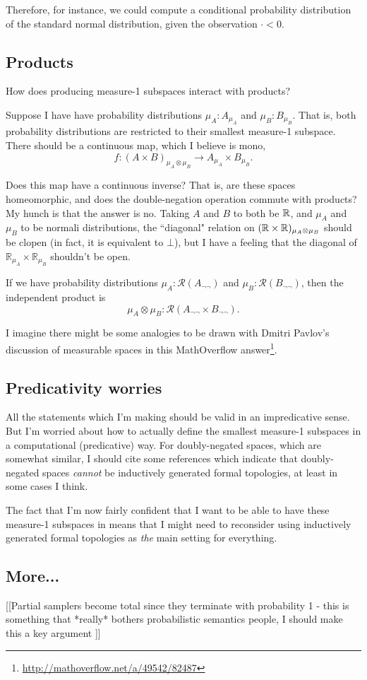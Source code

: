 Therefore, for instance, we could compute a conditional probability distribution of the standard normal distribution, given the observation $\cdot < 0$.

\subsection{Products}

How does producing measure-1 subspaces interact with products? 

Suppose I have have probability distributions $\mu_A : A_{\mu_A}$ and $\mu_B : B_{\mu_B}$. That is, both probability distributions are restricted to their smallest measure-1 subspace. There should be a continuous map, which I believe is mono,
\[f : (A \times B)_{\mu_A \otimes \mu_B} \to A_{\mu_A} \times B_{\mu_B}.\]

Does this map have a continuous inverse? That is, are these spaces homeomorphic, and does the double-negation operation commute with products? My hunch is that the answer is no. Taking $A$ and $B$ to both be $\mathbb{R}$, and $\mu_A$ and $\mu_B$ to be normali distributions, the ``diagonal" relation on $(\mathbb{R} \times \mathbb{R})_{\mu_A \otimes \mu_B}$ should be clopen (in fact, it is equivalent to $\bot$), but I have a feeling that the diagonal of $\mathbb{R}_{\mu_A} \times \mathbb{R}_{\mu_B}$ shouldn't be open.

If we have probability distributions $\mu_A : \mathcal{R}(A_{\neg\neg})$ and $\mu_B : \mathcal{R}(B_{\neg\neg})$, then the independent product is \[\mu_A \otimes \mu_B : \mathcal{R}(A_{\neg\neg} \times B_{\neg\neg}).\]

I imagine there might be some analogies to be drawn with Dmitri Pavlov's discussion of measurable spaces in this MathOverflow answer\footnote{\url{http://mathoverflow.net/a/49542/82487}}.

\subsection{Predicativity worries}
All the statements which I'm making should be valid in an impredicative sense. But I'm worried about how to actually define the smallest measure-1 subspaces in a computational (predicative) way. For doubly-negated spaces, which are somewhat similar, I should cite some references which indicate that doubly-negated spaces \emph{cannot} be inductively generated formal topologies, at least in some cases I think.

The fact that I'm now fairly confident that I want to be able to have these measure-1 subspaces in \contpl{} means that I might need to reconsider using inductively generated formal topologies as \emph{the} main setting for everything.

\subsection{More...}

[[Partial samplers become total since they terminate with probability 1 - this is something that *really* bothers probabilistic semantics people, I should make this a key argument ]]
